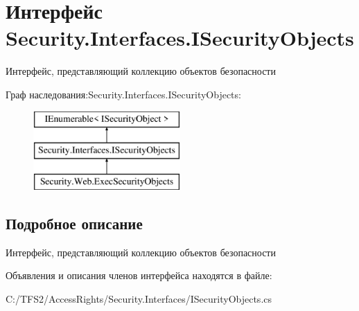 \hypertarget{interface_security_1_1_interfaces_1_1_i_security_objects}{}\section{Интерфейс Security.\+Interfaces.\+I\+Security\+Objects}
\label{interface_security_1_1_interfaces_1_1_i_security_objects}


Интерфейс, представляющий коллекцию объектов безопасности  


Граф наследования\+:Security.\+Interfaces.\+I\+Security\+Objects\+:\begin{figure}[H]
\begin{center}
\leavevmode
\includegraphics[height=3.000000cm]{df/db8/interface_security_1_1_interfaces_1_1_i_security_objects}
\end{center}
\end{figure}


\subsection{Подробное описание}
Интерфейс, представляющий коллекцию объектов безопасности 



Объявления и описания членов интерфейса находятся в файле\+:\begin{DoxyCompactItemize}
\item 
C\+:/\+T\+F\+S2/\+Access\+Rights/\+Security.\+Interfaces/I\+Security\+Objects.\+cs\end{DoxyCompactItemize}

